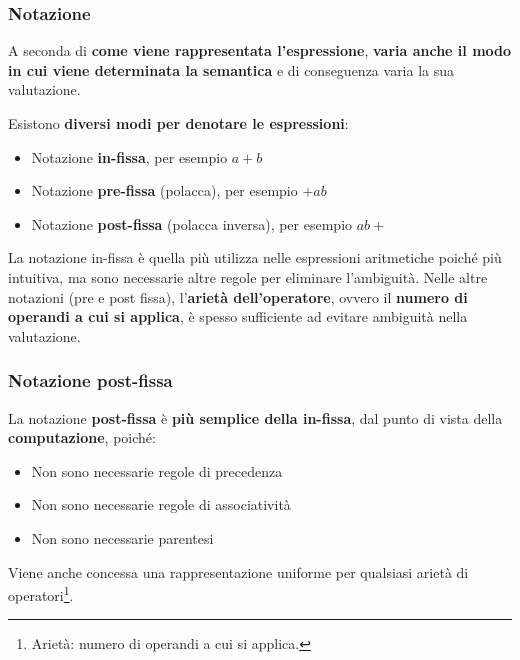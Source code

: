 \documentclass[a4paper]{article}
\begin{document}
	\subsubsection{Notazione}\label{notazione}
	
	A seconda di \textbf{come viene rappresentata l'espressione}, \textbf{varia anche il modo in cui viene determinata la semantica} e di conseguenza varia la sua valutazione.\newline
	
	\noindent
	Esistono \textbf{diversi modi per denotare le espressioni}:
	\begin{itemize}
		\item Notazione \textbf{in-fissa}, per esempio $a+b$
		\item Notazione \textbf{pre-fissa} (polacca), per esempio $+ab$
		\item Notazione \textbf{post-fissa} (polacca inversa), per esempio $ab+$
	\end{itemize}
	La notazione in-fissa è quella più utilizza nelle espressioni aritmetiche poiché più intuitiva, ma sono necessarie altre regole per eliminare l'ambiguità. Nelle altre notazioni (pre e post fissa), l'\textcolor{Red3}{\textbf{arietà dell'operatore}}, ovvero il \textbf{numero di operandi a cui si applica}, è spesso sufficiente ad evitare ambiguità nella valutazione.\newpage
	
	\subsubsection{Notazione post-fissa}\label{notazione post-fissa}
	
	La notazione \textcolor{Red3}{\textbf{post-fissa}} è \textbf{più semplice della in-fissa}, dal punto di vista della \textbf{computazione}, poiché:
	\begin{itemize}
		\item Non sono necessarie regole di precedenza
		\item Non sono necessarie regole di associatività
		\item Non sono necessarie parentesi
	\end{itemize}
	Viene anche concessa una rappresentazione uniforme per qualsiasi arietà di operatori\footnote{Arietà: numero di operandi a cui si applica.}.\newline
	
\end{document}
